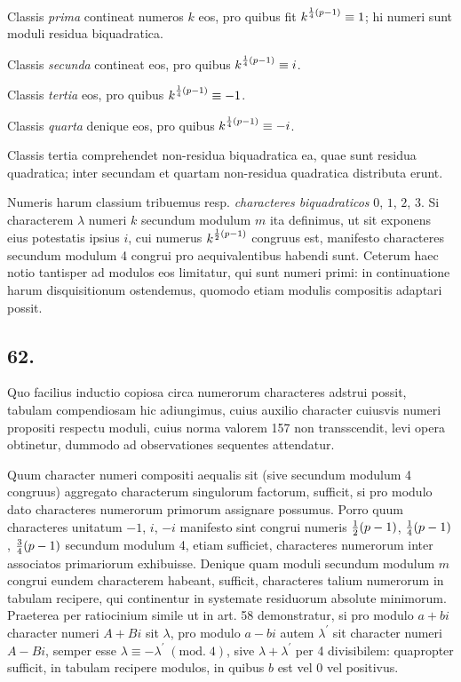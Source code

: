 \documentclass[twoside,12pt]{memoir}
\renewcommand{\pmod}[1]{\;(\textrm{mod.}\;#1)}
\let\oldfrac\frac
\def\frac#1#2{\mathchoice{\tfrac{#1}{#2}}{\oldfrac{#1}{#2}}{\genfrac{}{}{}{2}{#1}{#2\mathstrut}}{\genfrac{}{}{}{3}{#1}{#2\mathstrut}}}
\begin{document}
Classis \textit{prima} contineat numeros \(k\) eos, pro quibus fit \(k^{\frac{1}{4}(p-1)} \equiv 1\); hi numeri sunt moduli residua biquadratica.
 
Classis \textit{secunda} contineat eos, pro quibus \(k^{\frac{1}{4}(p-1)} \equiv i\).
 
Classis \textit{tertia} eos, pro quibus \(k^{\frac{1}{4}(p-1)} \equiv-1\).
 
Classis \textit{quarta} denique eos, pro quibus \(k^{\frac{1}{4}(p-1)} \equiv-i\).
 
Classis tertia comprehendet non-residua biquadratica ea, quae sunt residua quadratica; inter secundam et quartam non-residua quadratica distributa erunt.
 
Numeris harum classium tribuemus resp. \textit{characteres biquadraticos} \(0\), \(1\), \(2\), \(3\). Si characterem \(\lambda\) numeri \(k\) secundum modulum \(m\) ita definimus, ut sit exponens eius potestatis ipsius \(i\), cui numerus \(k^{\frac{1}{2}(p-1)}\) congruus est, manifesto characteres secundum modulum 4 congrui pro aequivalentibus habendi sunt. Ceterum haec notio tantisper ad modulos eos limitatur, qui sunt numeri primi: in continuatione harum disquisitionum ostendemus, quomodo etiam modulis compositis adaptari possit.

\subsection*{62.}
 
Quo facilius inductio copiosa circa numerorum characteres adstrui possit, tabulam compendiosam hic adiungimus, cuius auxilio character cuiusvis numeri propositi respectu moduli, cuius norma valorem 157 non transscendit, levi opera obtinetur, dummodo ad observationes sequentes attendatur.\pagebreak%
 
Quum character numeri compositi aequalis sit (sive secundum modulum 4 congruus) aggregato characterum singulorum factorum, sufficit, si pro modulo dato characteres numerorum primorum assignare possumus. Porro quum characteres unitatum \(-1\), \( i\), \(-i\) manifesto sint congrui numeris \(\frac{1}{2}(p-1)\), \( \frac{1}{4}(p-1)\), \( \frac{3}{4}(p-1)\) secundum modulum 4, etiam sufficiet, characteres numerorum inter associatos primariorum exhibuisse. Denique quam moduli secundum modulum \(m\) congrui eundem characterem habeant, sufficit, characteres talium numerorum in tabulam recipere, qui continentur in systemate residuorum absolute minimorum. Praeterea per ratiocinium simile ut in art. 58 demonstratur, si pro modulo \(a+b i\) character numeri \(A+B i\) sit \(\lambda\), pro modulo \(a-b i\) autem \(\lambda^{\prime}\) sit character numeri \(A-B i\), semper esse \(\lambda \equiv-\lambda^{\prime}\pmod{4}\), sive \(\lambda+\lambda^{\prime}\) per 4 divisibilem: quapropter sufficit, in tabulam recipere modulos, in quibus \(b\) est vel \(0\) vel positivus.
\end{document}
